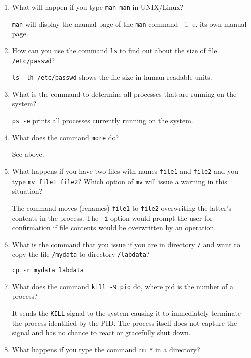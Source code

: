\begin{enumerate}
  \item What will happen if you type \texttt{man man} in UNIX/Linux?

        \texttt{man} will display the manual page of the \texttt{man} command---i.~e. its own manual page.

  \item How can you use the command \texttt{ls} to find out about the size of file \texttt{/etc/passwd}?

        \texttt{ls -lh /etc/passwd} shows the file size in human-readable units.

  \item What is the command to determine all processes that are running on the system?

        \texttt{ps -e} prints all processes currently running on the system.

  \item What does the command \texttt{more} do?

        See above.

  \item What happens if you have two files with names \texttt{file1} and \texttt{file2} and you type \texttt{mv file1 file2}? Which option of \texttt{mv} will issue a warning in this situation?

        The command moves (renames) \texttt{file1} to \texttt{file2} overwriting the latter's contents in the process.
        The \texttt{-i} option would prompt the user for confirmation if file contents would be overwritten by an operation.

  \item What is the command that you issue if you are in directory \texttt{/} and want to copy the file \texttt{/mydata} to directory \texttt{/labdata}?

        \texttt{cp -r mydata labdata}

  \item What does the command \texttt{kill -9 pid} do, where pid is the number of a process?

        It sends the \texttt{KILL} signal to the system causing it to immediately terminate the process identified by the PID.
        The process itself does not capture the signal and has no chance to react or gracefully shut down.

  \item What happens if you type the command \texttt{rm *} in a directory?


\end{enumerate}
